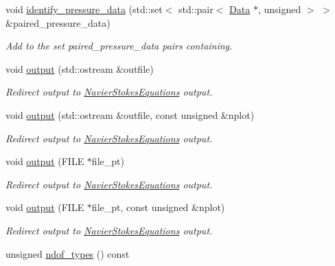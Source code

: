 \begin{DoxyCompactItemize}
void \hyperlink{classoomph_1_1GeneralisedNewtonianQTaylorHoodElement_a369b7a71e40d491ea34858e940431492}{identify\+\_\+pressure\+\_\+data} (std\+::set$<$ std\+::pair$<$ \hyperlink{classoomph_1_1Data}{Data} $\ast$, unsigned $>$ $>$ \&paired\+\_\+pressure\+\_\+data)
\begin{DoxyCompactList}\small\item\em Add to the set {\ttfamily paired\+\_\+pressure\+\_\+data} pairs containing. \end{DoxyCompactList}\item 
void \hyperlink{classoomph_1_1GeneralisedNewtonianQTaylorHoodElement_ac1e132d67adcf473addf1d85eabd1e1c}{output} (std\+::ostream \&outfile)
\begin{DoxyCompactList}\small\item\em Redirect output to \hyperlink{classoomph_1_1NavierStokesEquations}{Navier\+Stokes\+Equations} output. \end{DoxyCompactList}\item 
void \hyperlink{classoomph_1_1GeneralisedNewtonianQTaylorHoodElement_ad6972349bba7af653113c45a127ae5f0}{output} (std\+::ostream \&outfile, const unsigned \&nplot)
\begin{DoxyCompactList}\small\item\em Redirect output to \hyperlink{classoomph_1_1NavierStokesEquations}{Navier\+Stokes\+Equations} output. \end{DoxyCompactList}\item 
void \hyperlink{classoomph_1_1GeneralisedNewtonianQTaylorHoodElement_ab0d6408d32a068798cdb404db5daadad}{output} (F\+I\+LE $\ast$file\+\_\+pt)
\begin{DoxyCompactList}\small\item\em Redirect output to \hyperlink{classoomph_1_1NavierStokesEquations}{Navier\+Stokes\+Equations} output. \end{DoxyCompactList}\item 
void \hyperlink{classoomph_1_1GeneralisedNewtonianQTaylorHoodElement_a81288f63a98b7bf60ba3fbd31d1befa7}{output} (F\+I\+LE $\ast$file\+\_\+pt, const unsigned \&nplot)
\begin{DoxyCompactList}\small\item\em Redirect output to \hyperlink{classoomph_1_1NavierStokesEquations}{Navier\+Stokes\+Equations} output. \end{DoxyCompactList}\item 
unsigned \hyperlink{classoomph_1_1GeneralisedNewtonianQTaylorHoodElement_a526d20c2aaa5f0ba68436a06de012443}{ndof\+\_\+types} () const

\end{DoxyCompactItemize}

